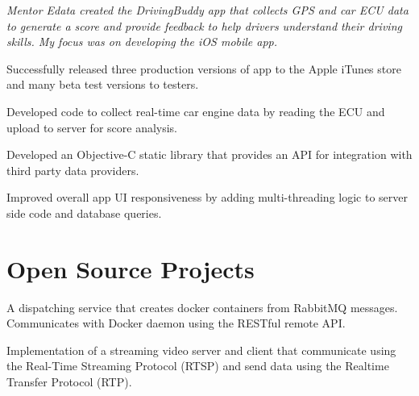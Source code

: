 \documentclass[letterpaper]{deedy-resume} %
\begin{document}
\begin{minipage}[t]{0.66\textwidth}
\sectionspace %


\textit{Mentor Edata created the DrivingBuddy app that collects GPS and car ECU data to generate a score and provide feedback to help drivers understand their driving skills. My focus was on developing the iOS mobile app.}
\vspace{0.75mm}
\begin{tightitemize}
\item Successfully released three production versions of app to the Apple iTunes store and many beta test versions to testers.
\item Developed code to collect real-time car engine data by reading the ECU and upload to server for score analysis.
\item Developed an Objective-C static library that provides an API for integration with third party data providers.
\item Improved overall app UI responsiveness by adding multi-threading logic to server side code and database queries.
\end{tightitemize}

\sectionspace %


\section{Open Source Projects}
A dispatching service that creates docker containers from RabbitMQ messages. Communicates with Docker daemon using the RESTful remote API.

\sectionspace %

Implementation of a streaming video server and client that communicate using the Real-Time Streaming Protocol (RTSP) and send data using the Realtime Transfer Protocol (RTP).


\end{minipage}
\end{document}
